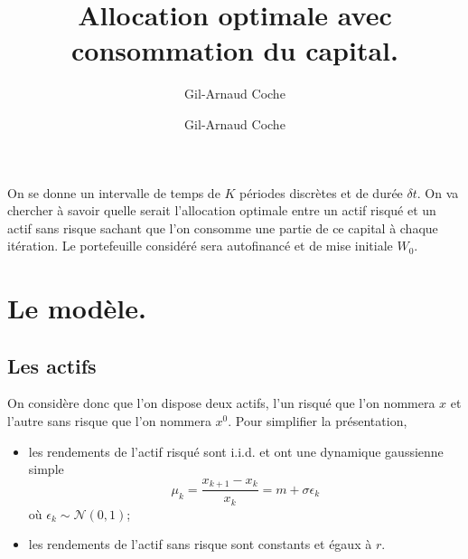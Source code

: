\documentclass{article}
\author{Gil-Arnaud Coche}
\numberwithin{equation}{section}
\begin{document}
\newtheorem{hyp}{Hypothese}
\newtheorem*{hyp*}{Hypothese}

{}
{}
{\pgfpoint{\size}{\size}}
{
  \pgfsetlinewidth{\thickness}
  \pgfpathcircle{}
}
\newdimen\thickness
{}

\newcommand{\W}{\mathcal{W}}
\newcommand{\B}{\mathcal{B}}
\newcommand{\diff}{\textnormal{d}}

\title{Allocation optimale avec consommation du capital.}

\author{Gil-Arnaud Coche}
\maketitle

On se donne un intervalle de temps de $K$ périodes discrètes et de durée $\delta t$. On va chercher à savoir quelle serait l'allocation optimale entre un actif risqué et un actif sans risque sachant que l'on consomme une partie de ce capital à chaque itération. Le portefeuille considéré sera autofinancé et de mise initiale $W_0$.

\section{Le modèle.}

\subsection{Les actifs}

On considère donc que l'on dispose deux actifs, l'un risqué que l'on nommera $x$ et l'autre sans risque que l'on nommera $x^0$. Pour simplifier la présentation,
\begin{itemize}
\item les rendements de l'actif risqué sont i.i.d. et ont une dynamique gaussienne simple
\begin{equation}
\mu_k = \frac{x_{k + 1} - x_k}{x_k} = m + \sigma \epsilon_k
\end{equation}
où $\epsilon_k\sim\mathcal N(0, 1)$;
\item les rendements de l'actif sans risque sont constants et égaux à $r$.
\end{itemize}
\end{document}
